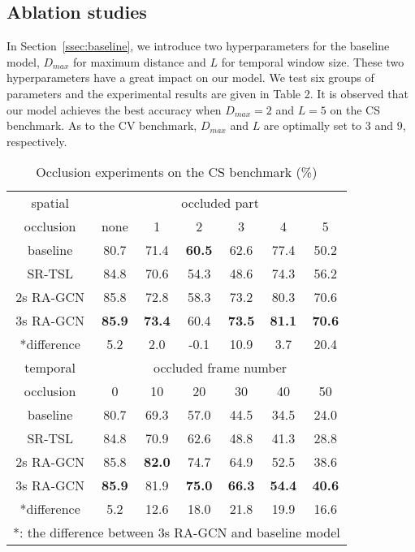 \documentclass{article}
\begin{document}
\subsection{Ablation studies}
\label{ssec:ablation}

In Section~\ref{ssec:baseline}, we introduce two hyperparameters for the baseline model, $D_{max}$ for maximum distance and $L$ for temporal window size. These two hyperparameters have a great impact on our model. We test six groups of parameters and the experimental results are given in Table 2. It is observed that our model achieves the best accuracy when $D_{max}=2$ and $L=5$ on the CS benchmark. As to the CV benchmark, $D_{max}$ and $L$ are optimally set to 3 and 9, respectively.

\begin{table}
\label{tab:3}
\caption{Occlusion experiments on the CS benchmark (\%)}
\centering
\begin{tabular}{ccccccc}
\hline
spatial & \multicolumn{6}{c}{occluded part} \\
\cline{2-7}
occlusion & none & 1 & 2 & 3 & 4 & 5 \\
\hline
baseline \cite{Yan2018} & 80.7 & 71.4 & {\bf 60.5} & 62.6 & 77.4 & 50.2 \\
SR-TSL \cite{Si2018} & 84.8 & 70.6 & 54.3 & 48.6 & 74.3 & 56.2 \\
2s RA-GCN & 85.8 & 72.8 & 58.3 & 73.2 & 80.3 & 70.6 \\
3s RA-GCN & {\bf 85.9} & {\bf 73.4} & 60.4 & {\bf 73.5} & {\bf 81.1} & {\bf 70.6} \\
*difference & 5.2 & 2.0 & -0.1 & 10.9 & 3.7 & 20.4 \\
\hline
\hline
temporal & \multicolumn{6}{c}{occluded frame number} \\
\cline{2-7}
occlusion & 0 & 10 & 20 & 30 & 40 & 50 \\
\hline
baseline \cite{Yan2018} & 80.7 & 69.3 & 57.0 & 44.5 & 34.5 & 24.0 \\
SR-TSL \cite{Si2018} & 84.8 & 70.9 & 62.6 & 48.8 & 41.3 & 28.8 \\
2s RA-GCN & 85.8 & {\bf 82.0} & 74.7 & 64.9 & 52.5 & 38.6 \\
3s RA-GCN & {\bf 85.9} & 81.9 & {\bf 75.0} & {\bf 66.3} & {\bf 54.4} & {\bf 40.6} \\
*difference & 5.2 & 12.6 & 18.0 & 21.8 & 19.9 & 16.6 \\
\hline
\multicolumn{7}{l}{*: the difference between 3s RA-GCN and baseline model}
\end{tabular}
\end{table}
\end{document}
